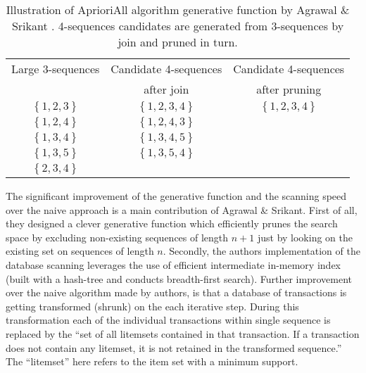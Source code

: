 \begin{table}
\begin{center}
    \begin{tabular}{ | c | c | c |}
    \hline
    Large 3-sequences & Candidate 4-sequences                     & Candidate 4-sequences \\ 
                      & after join                                & after pruning \\ 
    \hline
    $\left\{ 1, 2, 3 \right\} $ & $ \left\{ 1, 2, 3, 4 \right\} $ & $ \left\{ 1, 2, 3, 4 \right\} $ \\ 
    \hline
    $\left\{ 1, 2, 4 \right\} $ & $ \left\{ 1, 2, 4, 3 \right\} $ & \\ 
    \hline
    $\left\{ 1, 3, 4 \right\} $ & $ \left\{ 1, 3, 4, 5 \right\} $ & \\ 
    \hline
    $\left\{ 1, 3, 5 \right\} $ & $ \left\{ 1, 3, 5, 4 \right\} $ & \\ 
    \hline
    $\left\{ 2, 3, 4 \right\} $  &                                & \\ 
    \hline
    \end{tabular}
    \caption{Illustration of AprioriAll algorithm generative function by Agrawal \& Srikant \cite{citeulike:775528}. 4-sequences candidates are generated from 3-sequences by join and pruned in turn.}
    \label{fig:apriori}
    \end{center}
\end{table}

The significant improvement of the generative function and the scanning speed over the naive approach is a main contribution of Agrawal \& Srikant. First of all, they designed a clever generative function which efficiently prunes the search space by excluding non-existing sequences of length $n+1$ just by looking on the existing set on sequences of length $n$. Secondly, the authors implementation of the database scanning leverages the use of efficient intermediate in-memory index (built with a hash-tree and conducts breadth-first search). Further improvement over the naive algorithm made by authors, is that a database of transactions is getting transformed (shrunk) on the each iterative step. During this transformation each of the individual transactions within single sequence is replaced by the ``set of all litemsets contained in that transaction. If a transaction does not contain any litemset, it is not retained in the transformed sequence.'' The ``litemset'' here refers to the item set with a minimum support.

